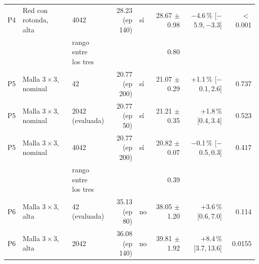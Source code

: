 \begin{table}[H]
\begin{tabular}{lllrlrrr}
P4 & \makecell[l]{Red con rotonda,\\{}alta} & 4042 & \makecell[r]{28.23\\{}(ep 140)} & sí & \makecell[r]{28.67\\{}$\pm$ 0.98} & \makecell[r]{$-$4.6\,\%\\{}[$-$5.9,\,$-$3.3]} & $<$\,0.001 \\
 & & \makecell[l]{rango entre\\{}los tres} & & & 0.80 & & \\
P5 & \makecell[l]{Malla $3 \times 3$,\\{}nominal} & 42 & \makecell[r]{20.77\\{}(ep 200)} & sí & \makecell[r]{21.07\\{}$\pm$ 0.29} & \makecell[r]{+1.1\,\%\\{}[$-$0.1,\,2.6]} & 0.737 \\
P5 & \makecell[l]{Malla $3 \times 3$,\\{}nominal} & \makecell[l]{2042\\{}(evaluada)} & \makecell[r]{20.77\\{}(ep 50)} & sí & \makecell[r]{21.21\\{}$\pm$ 0.35} & \makecell[r]{+1.8\,\%\\{}[0.4,\,3.4]} & 0.523 \\
P5 & \makecell[l]{Malla $3 \times 3$,\\{}nominal} & 4042 & \makecell[r]{20.77\\{}(ep 200)} & sí & \makecell[r]{20.82\\{}$\pm$ 0.07} & \makecell[r]{$-$0.1\,\%\\{}[$-$0.5,\,0.3]} & 0.417 \\
 & & \makecell[l]{rango entre\\{}los tres} & & & 0.39 & & \\
P6 & \makecell[l]{Malla $3 \times 3$,\\{}alta} & \makecell[l]{42\\{}(evaluada)} & \makecell[r]{35.13\\{}(ep 80)} & no & \makecell[r]{38.05\\{}$\pm$ 1.20} & \makecell[r]{+3.6\,\%\\{}[0.6,\,7.0]} & 0.114 \\
P6 & \makecell[l]{Malla $3 \times 3$,\\{}alta} & 2042 & \makecell[r]{36.08\\{}(ep 140)} & no & \makecell[r]{39.81\\{}$\pm$ 1.92} & \makecell[r]{+8.4\,\%\\{}[3.7,\,13.6]} & 0.0155 \\

\end{tabular}
\end{table}
